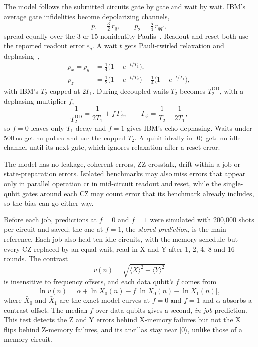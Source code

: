 \documentclass[aps,pra,reprint,nofootinbib,longbibliography,floatfix]{revtex4-2}
\newcommand{\ket}[1]{\lvert #1\rangle}
\begin{document}
The model follows the submitted circuits gate by gate and wait by wait.
IBM's average gate infidelities become depolarizing channels,
\begin{equation}
p_1 = \tfrac{3}{2}\,r_q, \qquad p_2 = \tfrac{5}{4}\,r_{qq'},
\label{eq:depol}
\end{equation}
spread equally over the 3 or 15 nonidentity Paulis~\cite{nielsen2002simple}.
Readout and reset both use the reported readout error $e_q$.
A wait $t$ gets Pauli-twirled relaxation and dephasing~\cite{ghosh2012surface},
\begin{equation}
\begin{aligned}
p_x = p_y &= \tfrac14\big(1-e^{-t/T_1}\big),\\
p_z &= \tfrac12\big(1-e^{-t/T_2}\big) - \tfrac14\big(1-e^{-t/T_1}\big),
\end{aligned}
\label{eq:idle}
\end{equation}
with IBM's $T_2$ capped at $2T_1$.
During decoupled waits $T_2$ becomes $T_2^{\mathrm{DD}}$, with a dephasing multiplier $f$,
\begin{equation}
\frac{1}{T_2^{\mathrm{DD}}} = \frac{1}{2T_1} + f\,\Gamma_\phi, \qquad \Gamma_\phi = \frac{1}{T_2} - \frac{1}{2T_1},
\label{eq:f}
\end{equation}
so $f=0$ leaves only $T_1$ decay and $f=1$ gives IBM's echo dephasing.
Waits under 500\,ns get no pulses and use the capped $T_2$.
A qubit ideally in $\ket{0}$ gets no idle channel until its next gate, which ignores relaxation after a reset error.

The model has no leakage, coherent errors, ZZ crosstalk, drift within a job or state-preparation errors.
Isolated benchmarks may also miss errors that appear only in parallel operation or in mid-circuit readout and reset, while the single-qubit gates around each CZ may count error that its benchmark already includes, so the bias can go either way.

Before each job, predictions at $f=0$ and $f=1$ were simulated with 200{,}000 shots per circuit and saved; the one at $f=1$, the \emph{stored prediction}, is the main reference.
Each job also held ten idle circuits, with the memory schedule but every CZ replaced by an equal wait, read in X and Y after 1, 2, 4, 8 and 16 rounds.
The contrast
\begin{equation}
v(n) = \sqrt{\langle X\rangle^2 + \langle Y\rangle^2}
\label{eq:contrast}
\end{equation}
is insensitive to frequency offsets, and each data qubit's $f$ comes from
\begin{equation}
\ln v(n) = \alpha + \ln \bar X_0(n) - f\big[\ln \bar X_0(n) - \ln \bar X_1(n)\big],
\label{eq:idlefit}
\end{equation}
where $\bar X_0$ and $\bar X_1$ are the exact model curves at $f=0$ and $f=1$ and $\alpha$ absorbs a contrast offset.
The median $f$ over data qubits gives a second, \emph{in-job} prediction.
This test detects the Z and Y errors behind X-memory failures but not the X flips behind Z-memory failures, and its ancillas stay near $\ket{0}$, unlike those of a memory circuit.
\end{document}
